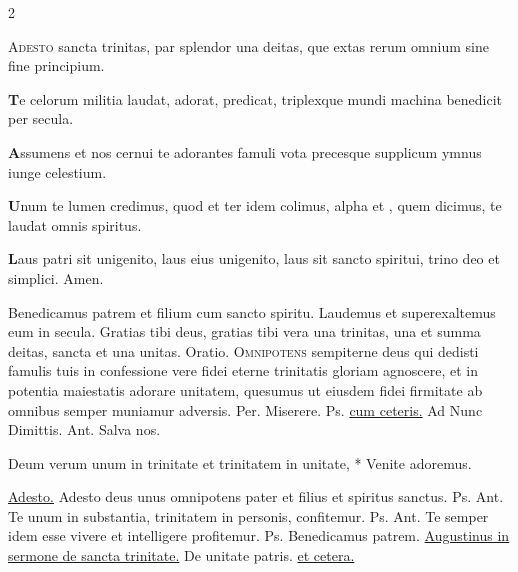 \begin{multicols*}{2}
{\lettrine[lines=2]{\zallmancaps \color{Blue} A}{desto} sancta trinitas,
par splendor una deitas,
que extas rerum omnium
sine fine principium.
\par {\bfseries \color{Red} T}e celorum militia
laudat, adorat, predicat,
triplexque mundi machina
benedicit per secula.
\par {\bfseries \color{Blue} A}ssumens et nos cernui
te adorantes famuli
vota precesque supplicum
ymnus iunge celestium.
\par {\bfseries \color{Red} U}num te lumen credimus,
quod et ter idem colimus,
alpha et \omega , quem dicimus,
te laudat omnis spiritus.
\par {\bfseries \color{Blue} L}aus patri sit unigenito,
laus eius unigenito,
laus sit sancto spiritui,
trino deo et simplici. Amen.
}
\newline \V Benedicamus patrem et filium cum sancto spiritu. \R Laudemus et superexaltemus eum in secula.
 Gratias tibi deus, gratias tibi vera una trinitas, una et summa deitas, sancta et una unitas. {\color{Red} Oratio.}
\lettrine[lines=2]{\zallmancaps \color{Red} O}{mnipotens} \hypertarget{omnipotens-trinitas}{\label{omnipotens-trinitas}} sempiterne deus qui dedisti famulis tuis in confessione vere fidei eterne trinitatis gloriam agnoscere, et in potentia maiestatis adorare unitatem, quesumus ut eiusdem fidei firmitate ab omnibus semper muniamur adversis. Per.
 Miserere. {\color{Red} Ps.}  \ul{cum ceteris.} {\color{Red} Ad Nunc Dimittis. Ant.} Salva nos.
\begin{invitatory}
{Deum verum unum in trinitate et trinitatem in unitate, * Venite adoremus.}
\end{invitatory}
 \hyperlink{adesto-sancta-trinitas}{Adesto.}
 Adesto deus unus omnipotens pater et filius et spiritus sanctus. {\color{Red} Ps.}  {\color{Red} Ant.} Te unum in substantia, trinitatem in personis, confitemur. {\color{Red} Ps.}  {\color{Red} Ant.} Te semper idem esse vivere et intelligere profitemur. {\color{Red} Ps.}  \V Benedicamus patrem.
\newline \ul{Augustinus in sermone de sancta trinitate.} De unitate patris. \ul{et cetera.} \grecross

\end{multicols*}
